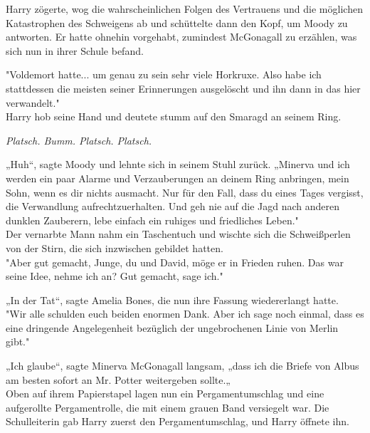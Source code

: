 {Harry zögerte, wog die wahrscheinlichen Folgen des Vertrauens und die möglichen Katastrophen des Schweigens ab und schüttelte dann den Kopf, um Moody zu antworten. Er hatte ohnehin vorgehabt, zumindest McGonagall zu erzählen, was sich nun in ihrer Schule befand.

"Voldemort hatte... um genau zu sein sehr viele Horkruxe. Also habe ich stattdessen die meisten seiner Erinnerungen ausgelöscht und ihn dann in das hier verwandelt."\\ Harry hob seine Hand und deutete stumm auf den Smaragd an seinem Ring.

\emph{Platsch. Bumm. Platsch. Platsch.}

„Huh“, sagte Moody und lehnte sich in seinem Stuhl zurück. „Minerva und ich werden ein paar Alarme und Verzauberungen an deinem Ring anbringen, mein Sohn, wenn es dir nichts ausmacht. Nur für den Fall, dass du eines Tages vergisst, die Verwandlung aufrechtzuerhalten. Und geh nie auf die Jagd nach anderen dunklen Zauberern, lebe einfach ein ruhiges und friedliches Leben."\\ Der vernarbte Mann nahm ein Taschentuch und wischte sich die Schweißperlen von der Stirn, die sich inzwischen gebildet hatten.\\ "Aber gut gemacht, Junge, du und David, möge er in Frieden ruhen. Das war seine Idee, nehme ich an? Gut gemacht, sage ich."

„In der Tat“, sagte Amelia Bones, die nun ihre Fassung wiedererlangt hatte.\\ "Wir alle schulden euch beiden enormen Dank. Aber ich sage noch einmal, dass es eine dringende Angelegenheit bezüglich der ungebrochenen Linie von Merlin gibt."

„Ich glaube“, sagte Minerva McGonagall langsam, „dass ich die Briefe von Albus am besten sofort an Mr. Potter weitergeben sollte.„\\ Oben auf ihrem Papierstapel lagen nun ein Pergamentumschlag und eine aufgerollte Pergamentrolle, die mit einem grauen Band versiegelt war. Die Schulleiterin gab Harry zuerst den Pergamentumschlag, und Harry öffnete ihn.

}
